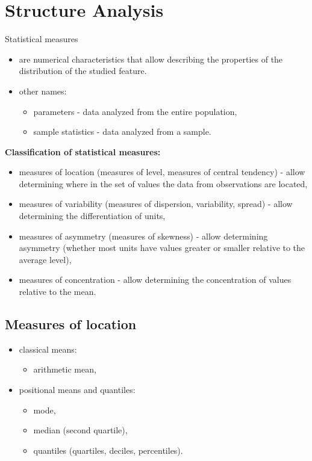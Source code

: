 \documentclass[
  english,
  letterpaper,
  DIV=11,
  numbers=noendperiod]{scrreprt}
\providecommand{\tightlist}{%
  \setlength{\itemsep}{0pt}\setlength{\parskip}{0pt}}
\begin{document}
\chapter{Structure Analysis}\label{structure-analysis-1}

Statistical measures

\begin{itemize}
\tightlist
\item
  are numerical characteristics that allow describing the properties of
  the distribution of the studied feature.
\item
  other names:

  \begin{itemize}
  \tightlist
  \item
    parameters - data analyzed from the entire population,
  \item
    sample statistics - data analyzed from a sample.
  \end{itemize}
\end{itemize}

\textbf{Classification of statistical measures:}

\begin{itemize}
\tightlist
\item
  measures of location (measures of level, measures of central tendency)
  - allow determining where in the set of values the data from
  observations are located,
\item
  measures of variability (measures of dispersion, variability, spread)
  - allow determining the differentiation of units,
\item
  measures of asymmetry (measures of skewness) - allow determining
  asymmetry (whether most units have values greater or smaller relative
  to the average level),
\item
  measures of concentration - allow determining the concentration of
  values relative to the mean.
\end{itemize}

\section{Measures of location}\label{measures-of-location}

\begin{itemize}
\tightlist
\item
  classical means:

  \begin{itemize}
  \tightlist
  \item
    arithmetic mean,
  \end{itemize}
\item
  positional means and quantiles:

  \begin{itemize}
  \tightlist
  \item
    mode,
  \item
    median (second quartile),
  \item
    quantiles (quartiles, deciles, percentiles).
  \end{itemize}
\end{itemize}
\end{document}
